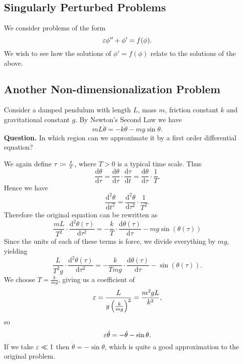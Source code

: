 \documentclass[class=article, crop=false]{standalone}
\begin{document}
  \subsection{Singularly Perturbed Problems}
  We consider problems of the form
  \[
    \varepsilon\phi'' + \phi' = f(\phi).
  \]
  We wish to see how the solutions of $\phi' = f(\phi)$ relate to the solutions of the above.
  \subsection{Another Non-dimensionalization Problem}
  Consider a damped pendulum with length $L$, mass $m$, friction constant $k$ and gravitational constant $g$. By Newton's Second Law we have
  \[
    mL\ddot\theta = -k \dot{\theta} - mg \sin \theta.
  \]
  \textbf{Question.} In which region can we approximate it by a first order differential equation? \par
  We again define $\tau\coloneqq \frac{t}{T}$, where $T > 0$ is a typical time scale. Thus
  \[
    \frac{\mathrm{d}\theta}{\mathrm{d}\tau} = \frac{\mathrm{d}\theta}{\mathrm{d}\tau} \cdot \frac{\mathrm{d}\tau}{\mathrm{d}t} = \frac{\mathrm{d}\theta}{\mathrm{d}\tau}\cdot \frac{1}{T}.
  \]
  Hence we have
  \[
    \frac{\mathrm{d}^2\theta}{\mathrm{d}t^2} = \frac{\mathrm{d}^2\theta}{\mathrm{d}\tau^2}\cdot \frac{1}{T^2}.
  \]
  Therefore the original equation can be rewritten as
  \[
    \frac{mL}{T^2}\cdot \frac{\mathrm{d}^2\theta(\tau)}{\mathrm{d}\tau^2} = -\frac{k}{T} \cdot \frac{\mathrm{d}\theta(\tau)}{\mathrm{d}\tau} - mg\sin(\theta(\tau))
  \]
  Since the units of each of these terms is force, we divide everything by $mg$, yielding
  \[
    \frac{L}{T^2g}\cdot \frac{\mathrm{d}^2\theta(\tau)}{\mathrm{d}\tau^2} = -\frac{k}{Tmg}\cdot \frac{\mathrm{d}\theta(\tau)}{\mathrm{d}\tau} - \sin(\theta(\tau)).
  \]
  We choose $T = \frac{k}{mg}$, giving us a coefficient of
  \[
    \varepsilon = \frac{L}{g\left( \frac{k}{mg} \right)^2} = \frac{m^2gL}{k^2},
  \]
  so
  \[
    \varepsilon\ddot\theta = -\dot{\theta} - \sin\theta.
  \]
  If we take $\varepsilon\ll 1$ then $\dot{\theta} = -\sin\theta$, which is quite a good approximation to the original problem.
\end{document}
